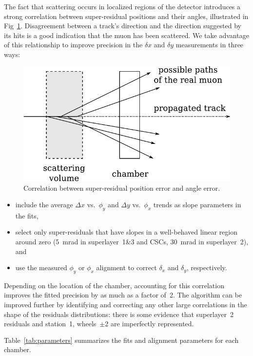 \documentclass[12pt]{article}
\begin{document}
The fact that scattering occurs in localized regions of the detector
introduces a strong correlation between super-residual positions and
their angles, illustrated in Fig~\ref{fig:sawtooth_diagram}.
Disagreement between a track's direction and the direction suggested
by its hits is a good indication that the muon has been scattered.  We
take advantage of this relationship to improve precision in the
$\delta x$ and $\delta y$ measurements in three ways:
\begin{figure}
\begin{center} \includegraphics[height=4.5 cm]{sawtooth_diagram.pdf} \end{center}
\caption{Correlation between super-residual position error and angle error. \label{fig:sawtooth_diagram}}
\end{figure}
\begin{itemize}
\item include the average $\Delta x$ vs.~$\phi_y$ and $\Delta y$
  vs.~$\phi_x$ trends as slope parameters in the fits,
\item select only super-residuals that have slopes in a well-behaved
  linear region around zero (5~mrad in superlayer~1\&3 and CSCs,
  30~mrad in superlayer~2), and
\item use the measured $\phi_y$ or $\phi_x$ alignment to correct
  $\delta_x$ and $\delta_y$, respectively.
\end{itemize}
Depending on the location of the chamber, accounting for this
correlation improves the fitted precision by as much as a factor of~2.
The algorithm can be improved further by identifying and correcting
any other large correlations in the shape of the residuals
distributions: there is some evidence that superlayer~2 residuals and
station~1, wheels~$\pm$2 are imperfectly represented.

Table~\ref{tab:parameters} summarizes the fits and alignment
parameters for each chamber.
\end{document}
